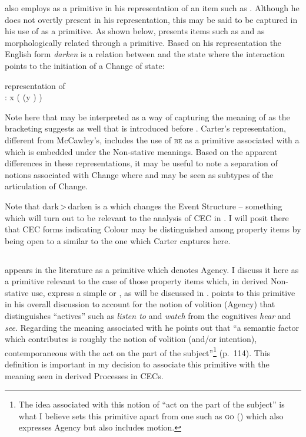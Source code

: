 \citet{Carter1976} also employs \CAUSE as a primitive in his
representation of an item such as \DARKEN.  Although he does not
overtly present \BECOME in his representation, this may be said to be
captured in his use of \CHANGE as a primitive.  As shown below,
\citet{Carter1976} presents items such as \DARK and \DARKEN as
morphologically related through a  primitive.  Based on his
representation the English form \textit{darken} is a relation between \CAUSE
and the state \BEDARK where the interaction points to the initiation
of a Change of state:

\ea%
\label{ex:4:14}
 representation of \DARKEN\\
\DARKEN: x \CAUSE ( (y \BEDARK) \CHANGE) 
\z

Note here that \CHANGE may be interpreted as a way of capturing the
meaning of \BECOME as the bracketing suggests as well that \CHANGE is
introduced before \CAUSE.  Carter’s representation, different from
McCawley’s, includes the use of \textsc{be} as a primitive associated with a
 which is embedded under the Non-stative meanings.  Based on the
apparent differences in these representations, it may be useful to
note a separation of notions associated with Change where \CAUSE and
\BECOME may be seen as subtypes of the articulation of Change.

Note that dark\,>\,darken is a  which changes the
Event Structure -- something which will turn out to be relevant to the
analysis of CEC  in . I will posit
there that CEC forms indicating Colour may be distinguished among
property items by being open to a  similar to the
one which Carter captures here.

\subsection{\DO}\label{sec:4.3.2}

\DO appears in the literature as a primitive which denotes Agency.  I
discuss it here as a primitive relevant to the case of those property
items which, in derived Non-stative use, express a simple  or
, as will be discussed in . \citet{Dowty1979}
points to this primitive in his overall discussion to account for the
notion of volition (Agency) that distinguishes ``actives” such as
\textit{listen to} and \textit{watch} from the cognitives
\textit{hear} and \textit{see}. Regarding the meaning associated with
\DO he points out that ``a semantic factor which \DO contributes is
roughly the notion of volition (and\slash or intention), contemporaneous
with the act on the part of the subject”\footnote{The idea associated
  with this notion of ``act on the part of the subject'' is what I
  believe sets this primitive apart from one such as \textsc{go}
  (\citealt{Jackendoff1972, Jackendoff1996}) which also expresses Agency but
  also includes motion.} (p.~114).  This definition is important in
my decision to associate this primitive with the meaning seen in
derived Processes in CECs.

